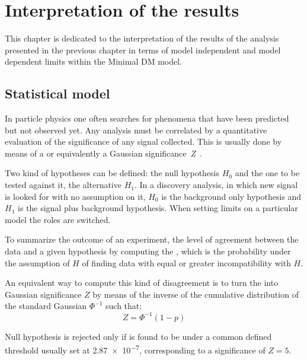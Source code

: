 \chapter{Interpretation of the results}
\label{chapt:int}
\lettrine{T}{}his chapter is dedicated to the interpretation of the results of the \mph analysis presented in the previous chapter in terms of model independent and model dependent limits within the Minimal DM model. 

\section{Statistical model}
In particle physics one often searches for phenomena that have been predicted but not observed yet. Any analysis must be correlated by a quantitative evaluation of the significance of any signal collected. This is usually done by means of a \p or equivalently a Gaussian \mbox{significance \emph{Z}~\cite{Cowan}}.

Two kind of hypotheses can be defined: the null hypothesis $H_{0}$ and the one to be tested against it, the alternative $H_{1}$. In a discovery analysis, in which new signal is looked for with no assumption on it, $H_{0}$ is the background only hypothesis and $H_{1}$ is the signal plus background hypothesis. When setting limits on a particular model the roles are switched.

To summarize the outcome of an experiment, the level of agreement between the data and a given hypothesis by computing the \p, which is the probability under the assumption of $H$ of finding data with equal or greater incompatibility with $H$.

An equivalent way to compute this kind of disagreement is to turn the \p into Gaussian significance $Z$ by means of the inverse of the cumulative distribution of the standard Gaussian $\Phi^{-1}$ such that:
\begin{equation}
  Z = \Phi^{-1}(1-p)
\end{equation}

Null hypothesis is rejected only if \p is found to be under a common defined threshold usually set at \num{2.87e-7}, corresponding to a significance of $Z=5$.

